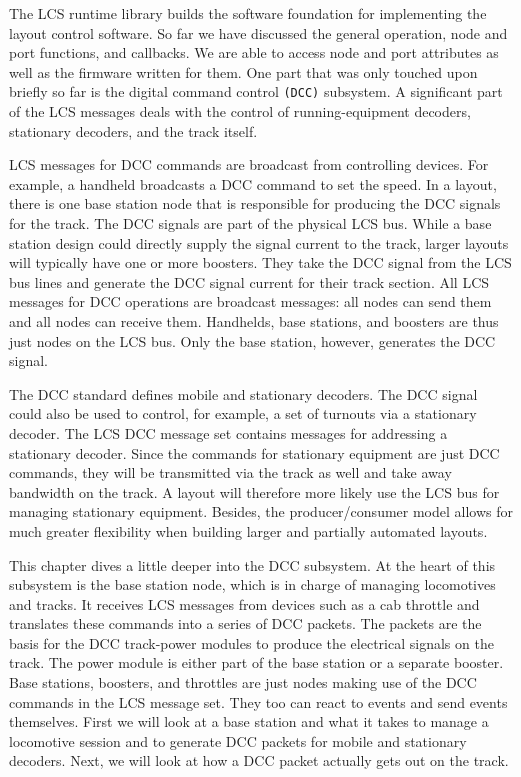 
The LCS runtime library builds the software foundation for implementing the layout control software. So far we have discussed the general operation, node and port functions, and callbacks. We are able to access node and port attributes as well as the firmware written for them. One part that was only touched upon briefly so far is the digital command control \texttt{(DCC)} subsystem. A significant part of the LCS messages deals with the control of running-equipment decoders, stationary decoders, and the track itself.

LCS messages for DCC commands are broadcast from controlling devices. For example, a handheld broadcasts a DCC command to set the speed. In a layout, there is one base station node that is responsible for producing the DCC signals for the track. The DCC signals are part of the physical LCS bus. While a base station design could directly supply the signal current to the track, larger layouts will typically have one or more boosters. They take the DCC signal from the LCS bus lines and generate the DCC signal current for their track section. All LCS messages for DCC operations are broadcast messages: all nodes can send them and all nodes can receive them. Handhelds, base stations, and boosters are thus just nodes on the LCS bus. Only the base station, however, generates the DCC signal.

The DCC standard defines mobile and stationary decoders. The DCC signal could also be used to control, for example, a set of turnouts via a stationary decoder. The LCS DCC message set contains messages for addressing a stationary decoder. Since the commands for stationary equipment are just DCC commands, they will be transmitted via the track as well and take away bandwidth on the track. A layout will therefore more likely use the LCS bus for managing stationary equipment. Besides, the producer/consumer model allows for much greater flexibility when building larger and partially automated layouts.

This chapter dives a little deeper into the DCC subsystem. At the heart of this subsystem is the base station node, which is in charge of managing locomotives and tracks. It receives LCS messages from devices such as a cab throttle and translates these commands into a series of DCC packets. The packets are the basis for the DCC track-power modules to produce the electrical signals on the track. The power module is either part of the base station or a separate booster. Base stations, boosters, and throttles are just nodes making use of the DCC commands in the LCS message set. They too can react to events and send events themselves. First we will look at a base station and what it takes to manage a locomotive session and to generate DCC packets for mobile and stationary decoders. Next, we will look at how a DCC packet actually gets out on the track.


